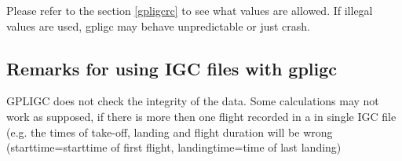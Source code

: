 
Please refer to the section \ref{gpligcrc} to see what values are allowed.
If illegal values are used, gpligc may behave unpredictable or just crash.




\subsection{Remarks for using IGC files with gpligc}
GPLIGC does not check the integrity of the data.
Some calculations may not work as supposed, if there is more then one flight recorded in a in single IGC file
(e.g. the times of take-off, landing and flight duration will be wrong (starttime=starttime of first flight, landingtime=time of last landing)


